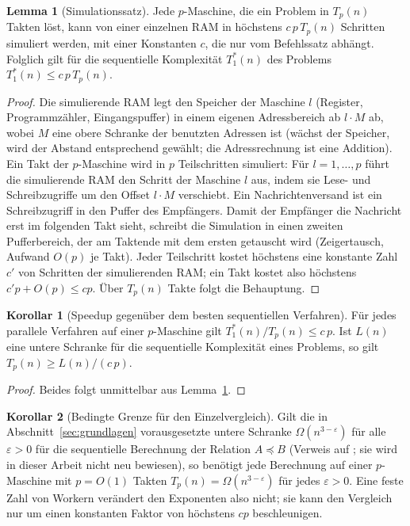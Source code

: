 \documentclass[a4paper,12pt, twoside]{report}
\theoremstyle{definition}
\newtheorem{lemma}{Lemma}
\newtheorem{korollar}{Korollar}
\begin{document}
\begin{lemma}[Simulationssatz]
\label{lem:p910_sim}
Jede $p$-Maschine, die ein Problem in $T_p(n)$ Takten löst, kann von einer einzelnen RAM in höchstens $c\,p\,T_p(n)$ Schritten simuliert werden, mit einer Konstanten $c$, die nur vom Befehlssatz abhängt. Folglich gilt für die sequentielle Komplexität $T^{\ast}_1(n)$ des Problems $T^\ast_1(n)\le c\,p\,T_p(n)$.
\end{lemma}

\begin{proof}
Die simulierende RAM legt den Speicher der Maschine $l$ (Register, Programmzähler, Eingangspuffer) in einem eigenen Adressbereich ab $l\cdot M$ ab, wobei $M$ eine obere Schranke der benutzten Adressen ist (wächst der Speicher, wird der Abstand entsprechend gewählt; die Adressrechnung ist eine Addition). Ein Takt der $p$-Maschine wird in $p$ Teilschritten simuliert: Für $l=1,\dots,p$ führt die simulierende RAM den Schritt der Maschine $l$ aus, indem sie Lese- und Schreibzugriffe um den Offset $l\cdot M$ verschiebt. Ein Nachrichtenversand ist ein Schreibzugriff in den Puffer des Empfängers. Damit der Empfänger die Nachricht erst im folgenden Takt sieht, schreibt die Simulation in einen zweiten Pufferbereich, der am Taktende mit dem ersten getauscht wird (Zeigertausch, Aufwand $O(p)$ je Takt). Jeder Teilschritt kostet höchstens eine konstante Zahl $c'$ von Schritten der simulierenden RAM; ein Takt kostet also höchstens $c'p+O(p)\le cp$. Über $T_p(n)$ Takte folgt die Behauptung.
\end{proof}

\begin{korollar}[Speedup gegenüber dem besten sequentiellen Verfahren]
\label{kor:p910_simulation}
Für jedes parallele Verfahren auf einer $p$-Maschine gilt $T^\ast_1(n)/T_p(n)\le c\,p$. Ist $L(n)$ eine untere Schranke für die sequentielle Komplexität eines Problems, so gilt $T_p(n)\ge L(n)/(c\,p)$.
\end{korollar}

\begin{proof}
Beides folgt unmittelbar aus Lemma~\ref{lem:p910_sim}.
\end{proof}

\begin{korollar}[Bedingte Grenze für den Einzelvergleich]
\label{kor:p910_seth}
Gilt die in Abschnitt~\ref{sec:grundlagen} vorausgesetzte untere Schranke $\Omega(n^{3-\varepsilon})$ für alle $\varepsilon>0$ für die sequentielle Berechnung der Relation $A\preceq B$ (Verweis auf \cite{epp2026subgraph}; sie wird in dieser Arbeit nicht neu bewiesen), so benötigt jede Berechnung auf einer $p$-Maschine mit $p=O(1)$ Takten $T_p(n)=\Omega(n^{3-\varepsilon})$ für jedes $\varepsilon>0$. Eine feste Zahl von Workern verändert den Exponenten also nicht; sie kann den Vergleich nur um einen konstanten Faktor von höchstens $cp$ beschleunigen.
\end{korollar}
\end{document}
